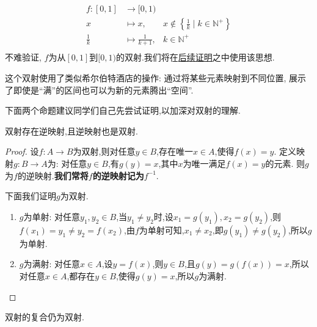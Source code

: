 \begin{example*}
    $$\begin{aligned}
            f: [0,1]    & \to [0,1)              &                                                               \\
            x           & \mapsto x ,            & x \notin \left\{ \frac{1}{k} \mid k \in \mathbb{N}^+ \right\} \\
            \frac{1}{k} & \mapsto \frac{1}{k+1}, & k \in \mathbb{N}^+                                            \\
        \end{aligned}$$
    不难验证, $f$为从$[0,1]$到$[0,1)$的双射.我们将在\hyperref[1.1.proof:infset-equiv]{后续证明}之中使用该思想.

    这个双射使用了类似希尔伯特酒店的操作: 通过将某些元素映射到不同位置, 展示了即使是“满”的区间也可以为新的元素腾出“空间”.
\end{example*}

下面两个命题建议同学们自己先尝试证明,以加深对双射的理解.

\begin{proposition}\label{1.1.prop:bij-inverse}
    双射存在逆映射,且逆映射也是双射.
\end{proposition}

\begin{proof}
    设$f:A\to B$为双射,则对任意$y\in B$,存在唯一$x\in A$,使得$f(x)=y$. 定义映射$g:B\to A$为: 对任意$y\in B$,有$g(y)=x$,其中$x$为唯一满足$f(x)=y$的元素. 则$g$为$f$的逆映射.\textbf{我们常将$f$的逆映射记为$f^{-1}$}.

    下面我们证明$g$为双射.

    \begin{enumerate}[(1)]
        \item $g$为单射: 对任意$y_1,y_2\in B$,当$y_1\neq y_2$时,设$x_1=g(y_1),x_2=g(y_2)$,则$f(x_1)=y_1\neq y_2=f(x_2)$,由$f$为单射可知,$x_1\neq x_2$,即$g(y_1)\neq g(y_2)$,所以$g$为单射.
        \item $g$为满射: 对任意$x\in A$,设$y=f(x)$,则$y\in B$,且$g(y)=g(f(x))=x$,所以对任意$x\in A$,都存在$y\in B$,使得$g(y)=x$,所以$g$为满射.
    \end{enumerate}
\end{proof}

\begin{proposition}\label{1.1.prop:bij-composite}
    双射的复合仍为双射.
\end{proposition}

